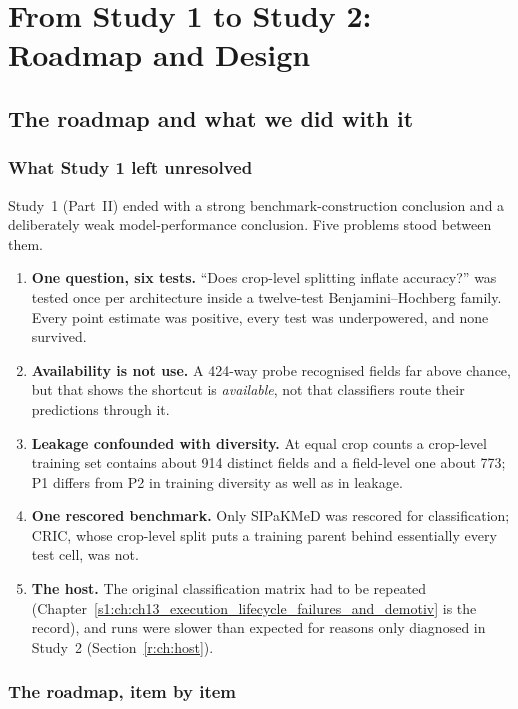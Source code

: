 \part{From Study 1 to Study 2: Roadmap and Design}

\chapter{The roadmap and what we did with it}
\label{r:ch:roadmap}

\section{What Study 1 left unresolved}

Study~1 (Part~II) ended with a strong benchmark-construction conclusion and a deliberately weak model-performance
conclusion. Five problems stood between them.

\begin{enumerate}[leftmargin=1.8em]
\item \textbf{One question, six tests.} ``Does crop-level splitting inflate accuracy?'' was tested once per
architecture inside a twelve-test Benjamini--Hochberg family. Every point estimate was positive, every test was
underpowered, and none survived.
\item \textbf{Availability is not use.} A 424-way probe recognised fields far above chance, but that shows the shortcut
is \emph{available}, not that classifiers route their predictions through it.
\item \textbf{Leakage confounded with diversity.} At equal crop counts a crop-level training set contains about 914
distinct fields and a field-level one about 773; P1 differs from P2 in training diversity as well as in leakage.
\item \textbf{One rescored benchmark.} Only SIPaKMeD was rescored for classification; CRIC, whose crop-level split puts a
training parent behind essentially every test cell, was not.
\item \textbf{The host.} The original classification matrix had to be repeated (Chapter~\ref{s1:ch:ch13_execution_lifecycle_failures_and_demotiv}
is the record), and runs were slower than expected for reasons only diagnosed in Study~2 (Section~\ref{r:ch:host}).
\end{enumerate}

\section{The roadmap, item by item}


